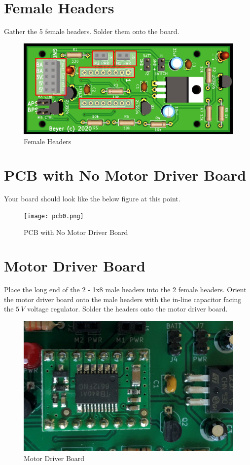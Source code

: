 \documentclass{handout}
\begin{document}
\newpage
\clearpage
\pagebreak

	\section{Female Headers}
	Gather the 5 female headers. Solder them onto the board.
	
	\begin{figure} [H]
		\centering
		\includegraphics[width=.5\textwidth]{femaleheaders.png}
		\caption{Female Headers}
	\end{figure}

	\section{PCB with No Motor Driver Board}
	Your board should look like the below figure at this point.
	\begin{figure} [H]
		\centering
		\texttt{[image: pcb0.png]}
		\caption{PCB with No Motor Driver Board}
	\end{figure}

	\section{Motor Driver Board}
	Place the long end of the 2 - 1x8 male headers into the 2 female headers. Orient the motor driver board onto the male headers with the in-line capacitor facing the $5\ V$ voltage regulator. Solder the headers onto the motor driver board.
	\begin{figure} [H]
		\centering
		\includegraphics[width=.5\textwidth]{motordriver.png}
		\caption{Motor Driver Board}
	\end{figure}
	
\newpage
\clearpage
\pagebreak
	
\end{document}
